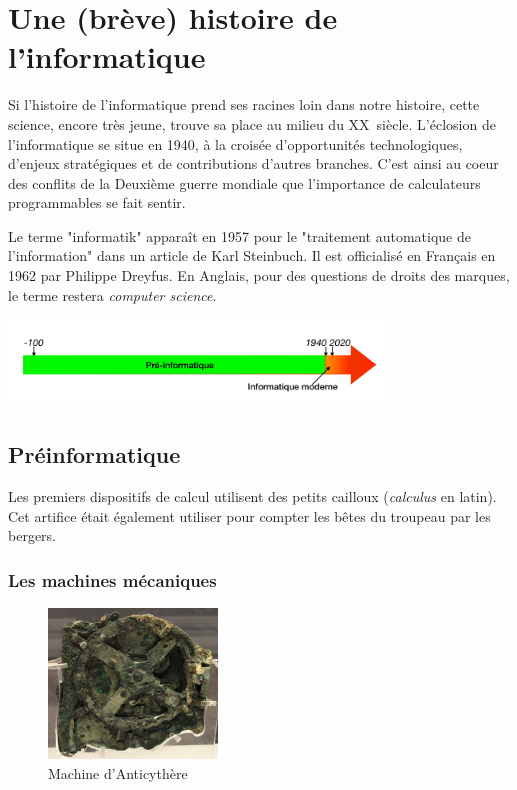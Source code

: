 \documentclass[a4paper,11pt]{book}
\begin{document}
\chapter*{Une (brève) histoire de l'informatique}

Si l'histoire de l'informatique prend ses racines loin dans notre histoire, cette science, encore très jeune, trouve sa place au milieu du \textsc{XX}\ieme ~siècle. L'éclosion de l'informatique se situe en 1940, à la croisée d'opportunités technologiques, d'enjeux stratégiques et de contributions d'autres branches. C'est ainsi au coeur des conflits de la Deuxième guerre mondiale que l'importance de calculateurs programmables se fait sentir.

Le terme "informatik" apparaît en 1957 pour le "traitement automatique de l'information" dans un article de Karl Steinbuch. Il est officialisé en Français en 1962 par Philippe Dreyfus. En Anglais, pour des questions de droits des marques, le terme restera \textit{computer science}.

\includegraphics[width=10cm]{media/infographies/chronos/Chronos.001.png}

\section{Préinformatique}
Les premiers dispositifs de calcul utilisent des petits cailloux (\textit{calculus} en latin). Cet artifice était également utiliser pour compter les bêtes du troupeau par les bergers.

\subsection{Les machines mécaniques}

\begin{figure} 
    \centering
    \includegraphics[width=0.4\textwidth]{media/machines/Anticythere.jpeg}
    \caption{Machine d'Anticythère}
\end{figure}
\end{document}
